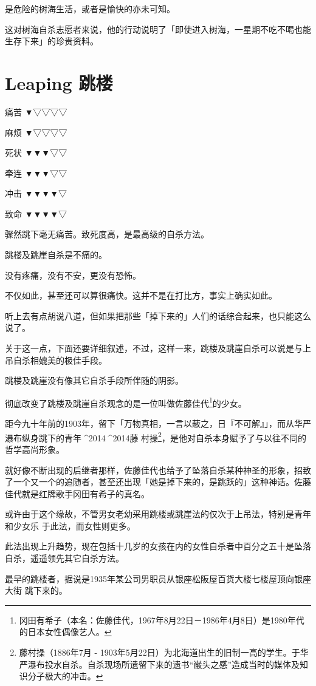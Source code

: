 \documentclass[UTF8]{ctexart}
\begin{document}
是危险的树海生活，或者是愉快的亦未可知。

这对树海自杀志愿者来说，他的行动说明了「即使进入树海，一星期不吃不喝也能生存下来」的珍贵资料。


\section{Leaping 跳楼}

痛苦 ▼▽▽▽▽

麻烦 ▼▽▽▽▽

死状 ▼▼▼▽▽

牵连 ▼▼▼▽▽

冲击 ▼▼▼▼▽

致命 ▼▼▼▼▽

骤然跳下毫无痛苦。致死度高，是最高级的自杀方法。

跳楼及跳崖自杀是不痛的。

没有疼痛，没有不安，更没有恐怖。

不仅如此，甚至还可以算很痛快。这并不是在打比方，事实上确实如此。

听上去有点胡说八道，但如果把那些「掉下来的」人们的话综合起来，也只能这么说了。

关于这一点，下面还要详细叙述，不过，这样一来，跳楼及跳崖自杀可以说是与上吊自杀相媲美的极佳手段。

跳楼及跳崖没有像其它自杀手段所伴随的阴影。

彻底改变了跳楼及跳崖自杀观念的是一位叫做佐藤佳代\footnote{冈田有希子（本名：佐藤佳代，1967年8月22日－1986年4月8日）是1980年代的日本女性偶像艺人。}的少女。

距今九十年前的1903年，留下「万物真相，一言以蔽之，日『不可解』」，而从华严瀑布纵身跳下的青年^^^^2014^^^^2014藤
村操\footnote{藤村操（1886年7月 - 1903年5月22日）为北海道出生的旧制一高的学生。于华严瀑布投水自杀。自杀现场所遗留下来的遗书“巌头之感”造成当时的媒体及知识分子极大的冲击。}，是他对自杀本身赋予了与以往不同的哲学高尚形象。

就好像不断出现的后继者那样，佐藤佳代也给予了坠落自杀某种神圣的形象，招致了一个又一个的追随者，甚至还出现「她是掉下来的，是跳跃的」这种神话。佐藤佳代就是红牌歌手冈田有希子的真名。

或许由于这个缘故，不管男女老幼采用跳楼或跳崖法的仅次于上吊法，特别是青年和少女乐 于此法，而女性则更多。

此法出现上升趋势，现在包括十几岁的女孩在内的女性自杀者中百分之五十是坠落自杀，遥遥领先其它自杀方法。

最早的跳楼者，据说是1935年某公司男职员从银座松阪屋百货大楼七楼屋顶向银座大街 跳下来的。
\end{document}
